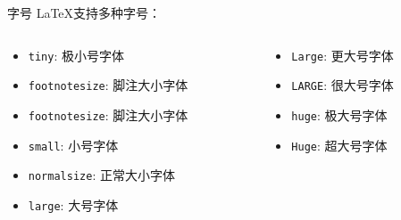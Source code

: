\documentclass{ctexbeamer}
\begin{document}
\begin{frame}{字号}
  \LaTeX 支持多种字号：
  
  \begin{columns}
    \begin{column}{0.4\textwidth}
      \begin{itemize}
      \item \texttt{tiny}: {\tiny 极小号字体}
      \item \texttt{footnotesize}: {\footnotesize 脚注大小字体}  
      \item \texttt{footnotesize}: {\footnotesize 脚注大小字体}
      \item \texttt{small}: {\small 小号字体}
      \item \texttt{normalsize}: {\normalsize 正常大小字体}
      \item \texttt{large}: {\large 大号字体}
        

      \end{itemize}
    \end{column}
    \begin{column}{0.6\textwidth}
      \begin{itemize}
      \item \texttt{Large}: {\Large 更大号字体}
      \item \texttt{LARGE}: {\LARGE 很大号字体}
      \item \texttt{huge}: {\huge 极大号字体}
      \item \texttt{Huge}: {\Huge 超大号字体}
      \end{itemize}
    \end{column}
  \end{columns}

\end{frame}
\end{document}
